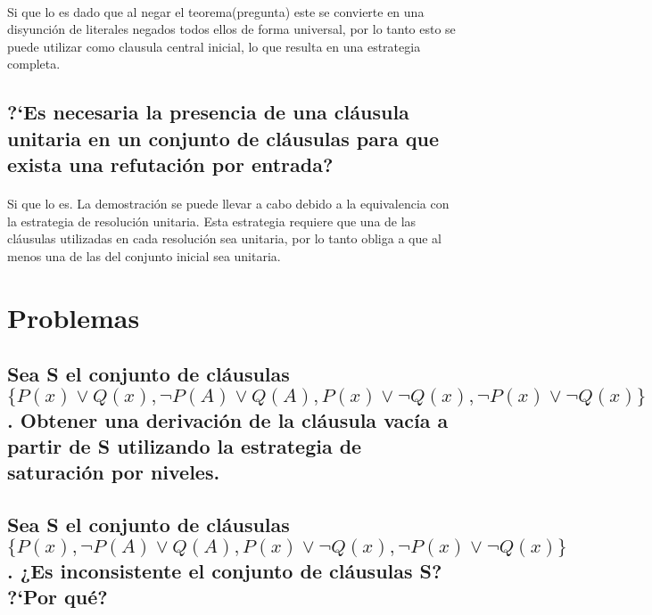 \documentclass[10pt, a4paper,spanish]{article}
\begin{document}
			\paragraph{}
			Si que lo es dado que al negar el teorema(pregunta) este se convierte en una disyunción de literales negados todos ellos de forma universal, por lo tanto esto se puede utilizar como clausula central inicial, lo que resulta en una estrategia completa.


		\subsection{?`Es necesaria la presencia de una cláusula unitaria en un conjunto de cláusulas para que exista una refutación por entrada?}

			\paragraph{}
			Si que lo es. La demostración se puede llevar a cabo debido a la equivalencia con la estrategia de resolución unitaria. Esta estrategia requiere que una de las cláusulas utilizadas en cada resolución sea unitaria, por lo tanto obliga a que al menos una de las del conjunto inicial sea unitaria.


	\section{Problemas}

		\subsection{Sea S el conjunto de cláusulas $ \{ P(x) \lor Q(x), \lnot P(A) \lor Q(A), P(x) \lor \lnot Q(x), \lnot P(x) \lor \lnot Q(x) \} $. Obtener una derivación de la cláusula vacía a partir de S utilizando la estrategia de saturación por niveles.}

			\paragraph{}


		\subsection{Sea S el conjunto de cláusulas $ \{ P(x), \lnot P(A) \lor Q(A), P(x) \lor \lnot Q(x), \lnot P(x) \lor \lnot Q(x) \} $. ¿Es inconsistente el conjunto de cláusulas S? ?`Por qué?}
\end{document}
